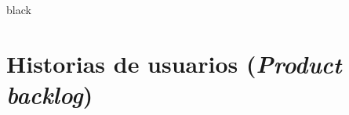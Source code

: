 \documentclass[11pt]{charter}
\begin{document}
\begin{consigna}{black}





\end{consigna}

\section{Historias de usuarios (\textit{Product backlog})}
\label{sec:backlog}

\end{document}
